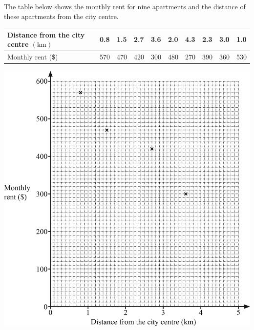 \newpage
\question
The table below shows the monthly rent for nine apartments and the distance of these apartments from
the city centre.
\begin{table}[H]
    \centering
 \begin{tabular}{|l|l|l|l|l|l|l|l|l|l|}
\hline Distance from the city centre $(\mathrm{km})$ & \cellcolor{gray!25}0.8 & \cellcolor{gray!25}1.5 & \cellcolor{gray!25}2.7 & \cellcolor{gray!25}3.6 & 2.0 & 4.3 & 2.3 & 3.0 & 1.0 \\
\hline Monthly rent (\$) & \cellcolor{gray!25}570 & \cellcolor{gray!25}470 & \cellcolor{gray!25}420 & \cellcolor{gray!25}300 & 480 & 270 & 390 & 360 & 530 \\
\hline
\end{tabular}
\end{table}
\begin{center}
        \includegraphics[scale=1]{Questions/quiz 10/images/Picture3.png}
\end{center}
